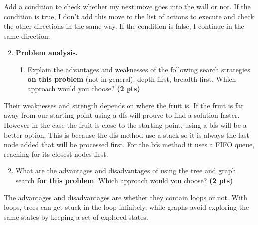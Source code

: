 \documentclass[11pt,a4paper]{../template/report}
\begin{document}
\begin{answer}
Add a condition to check whether my next move goes into the wall or not. If the condition is true, I don't add this move to the list of actions to execute and check the other directions in the same way. If the condition is false, I continue in the same direction.
\end{answer}



\begin{enumerate}
\setcounter{enumi}{1}
    \item \textbf{Problem analysis.}
    \begin{enumerate}
        \item Explain the advantages and weaknesses of the following search strategies \textbf{on this problem} (not in general): depth first, breadth first. Which approach would you choose? \textbf{(2 pts)}
    \end{enumerate}
\end{enumerate}

\begin{answer}
Their weaknesses and strength depends on where the fruit is. If the fruit is far away from our starting point using a dfs will prouve to find a solution faster. However in the case the fruit is close to the starting point, using a bfs will be a better option. This is because the dfs method use a stack so it is always the last node added that will be processed first. For the bfs method it uses a FIFO queue, reaching for its closest nodes first. 
\end{answer}



\begin{enumerate}
\setcounter{enumi}{1}
\begin{enumerate}
\setcounter{enumii}{1}
    \item What are the advantages and disadvantages of using the tree and graph search \textbf{for this problem}. Which approach would you choose? \textbf{(2 pts)}
\end{enumerate}
\end{enumerate}

\begin{answers}[4cm]
The advantages and disadvantages are whether they contain loops or not. With loops, trees can get stuck in the loop infinitely, while graphs avoid exploring the same states by keeping a set of explored states.
\end{answers}
\end{document}
